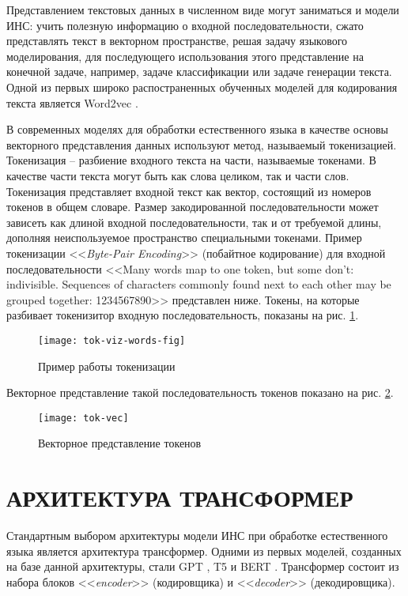 Представлением текстовых данных в численном виде могут заниматься и модели ИНС: учить полезную информацию о входной последовательности, сжато представлять текст в векторном пространстве, решая задачу языкового моделирования, для последующего использования этого представление на конечной задаче, например, задаче классификации или задаче генерации текста. Одной из первых широко распостраненных обученных моделей для кодирования текста является Word2vec \cite{word2vec-paper}.

В современных моделях для обработки естественного языка в качестве основы векторного представления данных используют метод, называемый токенизацией. Токенизация -- разбиение входного текста на части, называемые токенами. В качестве части текста могут быть как слова целиком, так и части слов. Токенизация представляет входной текст как вектор, состоящий из номеров токенов в общем словаре. Размер закодированной последовательности может зависеть как длиной входной последовательности, так и от требуемой длины, дополняя неиспользуемое пространство специальными токенами. Пример токенизации <<\textit{Byte-Pair Encoding}>> (побайтное кодирование) \cite{bpe-paper} для входной последовательности <<Many words map to one token, but some don't: indivisible. Sequences of characters commonly found next to each other may be grouped together: 1234567890>> представлен ниже. Токены, на которые разбивает токенизитор входную последовательность, показаны на рис. \ref{fig:tok-viz-words-fig}.
\begin{figure}[H]
    \centering
    \texttt{[image: tok-viz-words-fig]}
    \caption{Пример работы токенизации}
    \label{fig:tok-viz-words-fig}
\end{figure}

Векторное представление такой последовательность токенов показано на рис. \ref{fig:tok-vec}.
\begin{figure}[H]
    \centering
    \texttt{[image: tok-vec]}
    \caption{Векторное представление токенов}
    \label{fig:tok-vec}
\end{figure}

\section{АРХИТЕКТУРА ТРАНСФОРМЕР}
Стандартным выбором архитектуры модели ИНС при обработке естественного языка является архитектура трансформер. Одними из первых моделей, созданных на базе данной архитектуры, стали GPT \cite{gpt-paper}, T5 \cite{t5-paper} и BERT \cite{bert-paper}. Трансформер состоит из набора блоков <<\textit{encoder}>> (кодировщика) и <<\textit{decoder}>> (декодировщика).

